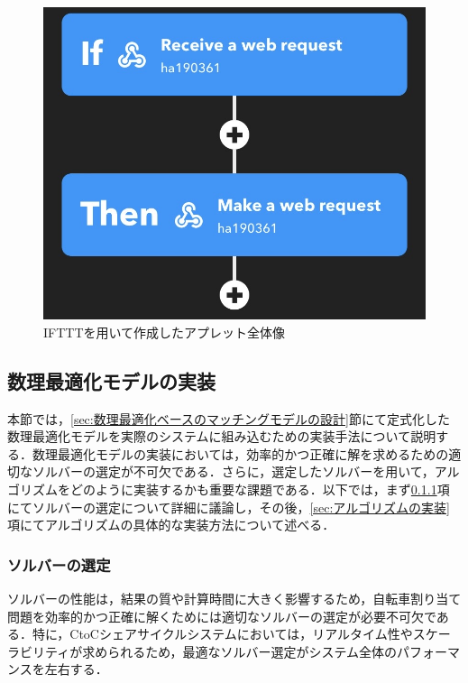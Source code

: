       \begin{figure}[htbp]
        \centering
        \includegraphics[scale=0.27]
        {figures/IFTTT-overall.jpg}
        \caption{IFTTTを用いて作成したアプレット全体像}
        \label{fig:IFTTTを用いて作成したアプレット全体像}
      \end{figure}
          
  \subsection{数理最適化モデルの実装}
    \label{sec:数理最適化モデルの実装}
      \par 本節では，\ref{sec:数理最適化ベースのマッチングモデルの設計}節にて定式化した数理最適化モデルを実際のシステムに組み込むための実装手法について説明する．数理最適化モデルの実装においては，効率的かつ正確に解を求めるための適切なソルバーの選定が不可欠である．さらに，選定したソルバーを用いて，アルゴリズムをどのように実装するかも重要な課題である．以下では，まず\ref{sec:ソルバーの選定}項にてソルバーの選定について詳細に議論し，その後，\ref{sec:アルゴリズムの実装}項にてアルゴリズムの具体的な実装方法について述べる．
      
      \subsubsection{ソルバーの選定}
        \label{sec:ソルバーの選定}
          \par ソルバーの性能は，結果の質や計算時間に大きく影響するため，自転車割り当て問題を効率的かつ正確に解くためには適切なソルバーの選定が必要不可欠である．特に，CtoCシェアサイクルシステムにおいては，リアルタイム性やスケーラビリティが求められるため，最適なソルバー選定がシステム全体のパフォーマンスを左右する．
          
